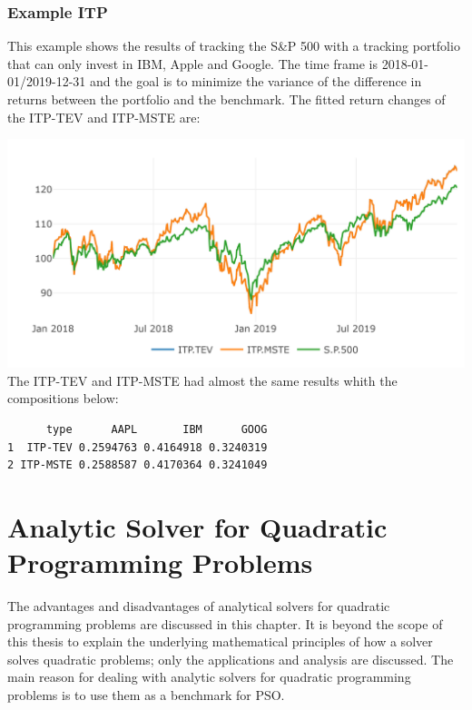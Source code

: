 \documentclass[
  oneside]{book}
\begin{document}
\hypertarget{example-itp}{%
\subsection{Example ITP}\label{example-itp}}

This example shows the results of tracking the S\&P 500 with a tracking portfolio that can only invest in IBM, Apple and Google. The time frame is 2018-01-01/2019-12-31 and the goal is to minimize the variance of the difference in returns between the portfolio and the benchmark. The fitted return changes of the ITP-TEV and ITP-MSTE are:

\includegraphics{Master_Thesis_files/figure-latex/ITP_ex-1.png}
The ITP-TEV and ITP-MSTE had almost the same results whith the compositions below:

\begin{verbatim}
      type      AAPL       IBM      GOOG
1  ITP-TEV 0.2594763 0.4164918 0.3240319
2 ITP-MSTE 0.2588587 0.4170364 0.3241049
\end{verbatim}

\hypertarget{analytic-solver-for-quadratic-programming-problems}{%
\chapter{Analytic Solver for Quadratic Programming Problems}\label{analytic-solver-for-quadratic-programming-problems}}

The advantages and disadvantages of analytical solvers for quadratic programming problems are discussed in this chapter. It is beyond the scope of this thesis to explain the underlying mathematical principles of how a solver solves quadratic problems; only the applications and analysis are discussed. The main reason for dealing with analytic solvers for quadratic programming problems is to use them as a benchmark for PSO.
\end{document}
